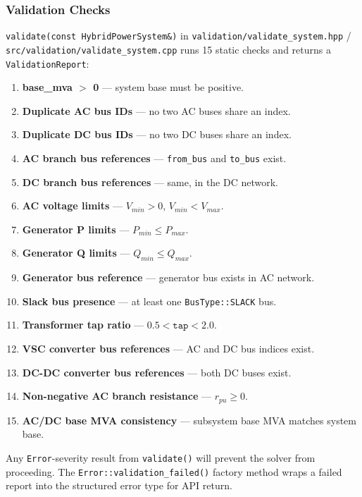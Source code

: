 \subsubsection{Validation Checks}

\texttt{validate(const HybridPowerSystem\&)} in
\texttt{validation/validate\_system.hpp} / \texttt{src/validation/validate\_system.cpp}
runs 15 static checks and returns a \texttt{ValidationReport}:

\begin{enumerate}
  \item \textbf{base\_mva $>$ 0} --- system base must be positive.
  \item \textbf{Duplicate AC bus IDs} --- no two AC buses share an index.
  \item \textbf{Duplicate DC bus IDs} --- no two DC buses share an index.
  \item \textbf{AC branch bus references} --- \texttt{from\_bus} and \texttt{to\_bus} exist.
  \item \textbf{DC branch bus references} --- same, in the DC network.
  \item \textbf{AC voltage limits} --- $V_{min} > 0$, $V_{min} < V_{max}$.
  \item \textbf{Generator P limits} --- $P_{min} \leq P_{max}$.
  \item \textbf{Generator Q limits} --- $Q_{min} \leq Q_{max}$.
  \item \textbf{Generator bus reference} --- generator bus exists in AC network.
  \item \textbf{Slack bus presence} --- at least one \texttt{BusType::SLACK} bus.
  \item \textbf{Transformer tap ratio} --- $0.5 < \texttt{tap} < 2.0$.
  \item \textbf{VSC converter bus references} --- AC and DC bus indices exist.
  \item \textbf{DC-DC converter bus references} --- both DC buses exist.
  \item \textbf{Non-negative AC branch resistance} --- $r_{pu} \geq 0$.
  \item \textbf{AC/DC base MVA consistency} --- subsystem base MVA matches system base.
\end{enumerate}

Any \texttt{Error}-severity result from \texttt{validate()} will prevent the
solver from proceeding.  The \texttt{Error::validation\_failed()} factory
method wraps a failed report into the structured error type for API return.

